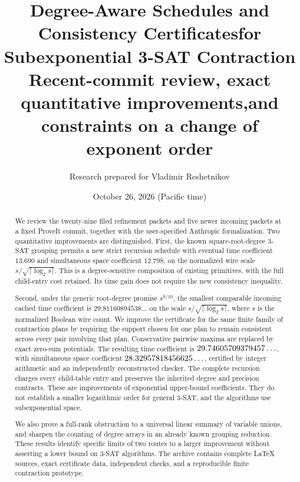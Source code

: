 \documentclass[11pt]{article}
\title{Degree-Aware Schedules and Consistency Certificates\newline for Subexponential 3-SAT Contraction\\[.65em]\large Recent-commit review, exact quantitative improvements,\newline and constraints on a change of exponent order}
\author{Research prepared for Vladimir Reshetnikov}
\date{October 26, 2026 (Pacific time)}
\theoremstyle{definition}
\theoremstyle{remark}
\begin{document}
\maketitle
\begin{abstract}
We review the twenty-nine filed refinement packets and five newer incoming
packets at a fixed ProveIt commit, together with the user-specified Anthropic
formalization. Two quantitative improvements are distinguished. First, the
known square-root-degree 3-SAT grouping permits a new strict recursion
schedule with eventual time coefficient $13.690$ and simultaneous space
coefficient $12.798$, on the normalized wire scale
$s/\sqrt{\lceil\log_2s\rceil}$. This is a degree-sensitive composition of
existing primitives, with the full child-entry cost retained. Its time gain
does not require the new consistency inequality.

Second, under the generic root-degree promise $s^{9/10}$, the smallest
comparable incoming cached time coefficient is
$29.81160894538\ldots$ on the scale $s/\sqrt{\lceil\log_2s\rceil}$, where
$s$ is the normalized Boolean wire count. We improve the certificate for the
same finite family of contraction plans by requiring the support chosen for
one plan to remain consistent across every pair involving that plan.
Conservative pairwise maxima are replaced by exact zero-sum potentials.
The resulting time coefficient is $29.74605709379457\ldots$, with simultaneous
space coefficient $28.32957818456625\ldots$, certified by integer arithmetic
and an independently reconstructed checker. The complete recursion charges
every child-table entry and preserves the inherited degree and precision
contracts. These are improvements of exponential upper-bound coefficients.
They do not establish a smaller logarithmic order for general 3-SAT, and
the algorithms use subexponential space.

We also prove a full-rank obstruction to a universal linear summary of
variable unions, and sharpen the counting of degree arrays in an already
known grouping reduction. These results identify specific limits of two
routes to a larger improvement without asserting a lower bound on 3-SAT
algorithms. The archive contains complete LaTeX sources, exact certificate
data, independent checks, and a reproducible finite contraction prototype.
\end{abstract}
\clearpage
{\small\setlength{\parskip}{0pt}\tableofcontents}
\clearpage








\appendix


\end{document}

